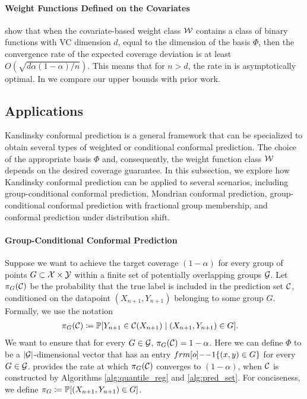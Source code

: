 \paragraph{Weight Functions Defined on the Covariates}

\citet{ACDR24} show that when the covariate-based weight class ${\cal W}$ contains a class of binary functions with VC dimension $d$, equal to the dimension of the basis $\Phi$, then the convergence rate of the expected coverage deviation is at least $O(\sqrt{d \alpha(1-\alpha)/n})$. This means that for $n > d$, the rate in  is asymptotically optimal. In  we compare our upper bounds with prior work.

\subsection{Applications}
Kandinsky conformal prediction is a general framework that can be specialized to obtain several types of weighted or conditional conformal prediction. The choice of the appropriate basis $\Phi$ and, consequently, the weight function class ${\cal W}$ depends on the desired coverage guarantee. In this subsection, we explore how Kandinsky conformal prediction can be applied to several scenarios, including group-conditional conformal prediction, Mondrian conformal prediction, group-conditional conformal prediction with fractional group membership, and conformal prediction under distribution shift.

\paragraph{Group-Conditional Conformal Prediction} Suppose we want to achieve the target coverage $(1-\alpha)$ for every group of points $G \subset {\cal X} \times {\cal Y}$ within a finite set of potentially overlapping groups ${\cal G}$. Let $\pi_G({\cal C})$ be the probability that the true label is included in the prediction set ${\cal C}$, conditioned on the datapoint $(X_{n+1},Y_{n+1})$ belonging to some group $G$. Formally, we use the notation
\begin{align*}
    &\pi_{G}({\cal C}) \coloneqq \mathbb{P}[Y_{n+1}\in {\cal C}(X_{n+1}) \mid (X_{n+1},Y_{n+1})\in G].
\end{align*}
We want to ensure that for every $G \in {\cal G}$, $\pi_G({\cal C}) = 1-\alpha$. Here we can define $\Phi$ to be a $|{\cal G}|$-dimensional vector that has an entry $\11\{(x,y) \in G\}$ for every $G \in {\cal G}$.  provides the rate at which $\pi_G({\cal C})$ converges to $(1-\alpha)$, when ${\cal C}$ is constructed by Algorithms \ref{alg:quantile_reg} and \ref{alg:pred_set}. For conciseness, we define $\pi_G \coloneqq \mathbb{P}[(X_{n+1},Y_{n+1}) \in G]$.


